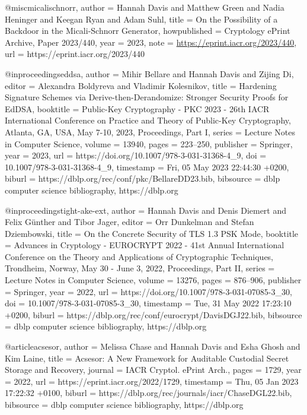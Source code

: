 @misc{micalischnorr,
      author = {Hannah Davis and Matthew Green and Nadia Heninger and Keegan Ryan and Adam Suhl},
      title = {On the Possibility of a Backdoor in the Micali-Schnorr Generator},
      howpublished = {Cryptology ePrint Archive, Paper 2023/440},
      year = {2023},
      note = {\url{https://eprint.iacr.org/2023/440}},
      url = {https://eprint.iacr.org/2023/440}
}



@inproceedings{eddsa,
	author       = {Mihir Bellare and
		Hannah Davis and
		Zijing Di},
	editor       = {Alexandra Boldyreva and
		Vladimir Kolesnikov},
	title        = {Hardening Signature Schemes via Derive-then-Derandomize: Stronger
		Security Proofs for EdDSA},
	booktitle    = {Public-Key Cryptography - {PKC} 2023 - 26th {IACR} International Conference
		on Practice and Theory of Public-Key Cryptography, Atlanta, GA, USA,
		May 7-10, 2023, Proceedings, Part {I}},
	series       = {Lecture Notes in Computer Science},
	volume       = {13940},
	pages        = {223--250},
	publisher    = {Springer},
	year         = {2023},
	url          = {https://doi.org/10.1007/978-3-031-31368-4\_9},
	doi          = {10.1007/978-3-031-31368-4\_9},
	timestamp    = {Fri, 05 May 2023 22:44:30 +0200},
	biburl       = {https://dblp.org/rec/conf/pkc/BellareDD23.bib},
	bibsource    = {dblp computer science bibliography, https://dblp.org}
}



@inproceedings{tight-ake-ext,
	author       = {Hannah Davis and
		Denis Diemert and
		Felix G{\"{u}}nther and
		Tibor Jager},
	editor       = {Orr Dunkelman and
		Stefan Dziembowski},
	title        = {On the Concrete Security of {TLS} 1.3 {PSK} Mode},
	booktitle    = {Advances in Cryptology - {EUROCRYPT} 2022 - 41st Annual International
		Conference on the Theory and Applications of Cryptographic Techniques,
		Trondheim, Norway, May 30 - June 3, 2022, Proceedings, Part {II}},
	series       = {Lecture Notes in Computer Science},
	volume       = {13276},
	pages        = {876--906},
	publisher    = {Springer},
	year         = {2022},
	url          = {https://doi.org/10.1007/978-3-031-07085-3\_30},
	doi          = {10.1007/978-3-031-07085-3\_30},
	timestamp    = {Tue, 31 May 2022 17:23:10 +0200},
	biburl       = {https://dblp.org/rec/conf/eurocrypt/DavisDGJ22.bib},
	bibsource    = {dblp computer science bibliography, https://dblp.org}
}



@article{acsesor,
	author       = {Melissa Chase and
		Hannah Davis and
		Esha Ghosh and
		Kim Laine},
	title        = {Acsesor: {A} New Framework for Auditable Custodial Secret Storage
		and Recovery},
	journal      = {{IACR} Cryptol. ePrint Arch.},
	pages        = {1729},
	year         = {2022},
	url          = {https://eprint.iacr.org/2022/1729},
	timestamp    = {Thu, 05 Jan 2023 17:22:32 +0100},
	biburl       = {https://dblp.org/rec/journals/iacr/ChaseDGL22.bib},
	bibsource    = {dblp computer science bibliography, https://dblp.org}
}





